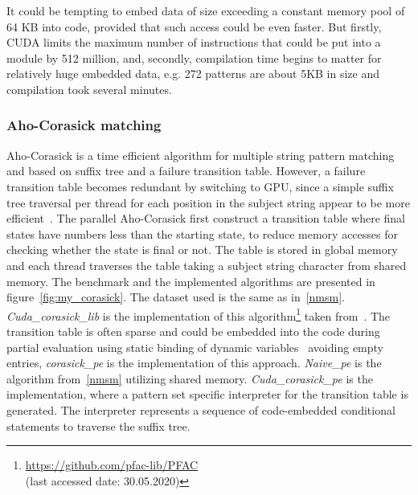 It could be tempting to embed data of size exceeding a constant memory pool 
of 64 KB into code, provided that such access could be even faster. But 
firstly, CUDA limits the maximum number of instructions that could be put into a module by 512 million, and, secondly, 
compilation time begins to matter for relatively huge embedded data, 
e.g. 272 patterns are about 5KB in size and compilation took several minutes.


\subsubsection{Aho-Corasick matching}
Aho-Corasick is a time efficient algorithm for 
multiple string pattern matching~\cite{Aho-Corasick} 
and based on suffix tree and a failure transition table. 
However, a failure transition table becomes redundant by switching 
to GPU, since a simple suffix tree traversal per thread for each 
position in the subject string appear to be more efficient~\cite{PFAC}. 
The parallel Aho-Corasick first construct a transition table where final 
states have numbers less than the starting state, to reduce memory accesses 
for checking whether the state is final or not. The table is stored in 
global memory and each thread traverses the table taking a subject 
string character from shared memory. The benchmark and the implemented 
algorithms are presented in figure~\ref{fig:my_corasick}. The dataset used is 
the same as in~\ref{nmsm}. \emph{Cuda\_corasick\_lib} is the implementation 
of this algorithm\footnote{\url{https://github.com/pfac-lib/PFAC} \\
 (last accessed date: 30.05.2020)} taken from~\cite{PFAC}. The transition table is often sparse and could be embedded into the code during partial evaluation using static binding of dynamic variables~\cite{Jones1993} avoiding empty entries, \emph{corasick\_pe} is the implementation of this approach. \emph{Naive\_pe} is the algorithm from~\ref{nmsm} utilizing shared memory. \emph{Cuda\_corasick\_pe} is the implementation, where a pattern set specific interpreter for the transition table is generated. The interpreter represents a sequence of code-embedded conditional statements to traverse the suffix tree.


